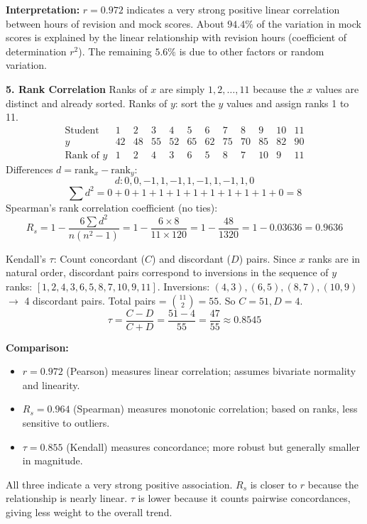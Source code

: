 \documentclass[11pt]{article}
\begin{document}
\begin{exoresolu}
\textbf{Interpretation:} $r = 0.972$ indicates a very strong positive linear correlation between hours of revision and mock scores. About $94.4\%$ of the variation in mock scores is explained by the linear relationship with revision hours (coefficient of determination $r^2$). The remaining $5.6\%$ is due to other factors or random variation.

\textbf{5. Rank Correlation}
Ranks of $x$ are simply $1,2,\dots,11$ because the $x$ values are distinct and already sorted.
Ranks of $y$: sort the $y$ values and assign ranks 1 to 11.
\[
\begin{array}{c|ccccccccccc}
\text{Student} & 1 & 2 & 3 & 4 & 5 & 6 & 7 & 8 & 9 & 10 & 11 \\
\hline
y & 42 & 48 & 55 & 52 & 65 & 62 & 75 & 70 & 85 & 82 & 90 \\
\text{Rank of } y & 1 & 2 & 4 & 3 & 6 & 5 & 8 & 7 & 10 & 9 & 11
\end{array}
\]
Differences $d = \text{rank}_x - \text{rank}_y$:
\[
d: 0, 0, -1, 1, -1, 1, -1, 1, -1, 1, 0
\]
\[
\sum d^2 = 0+0+1+1+1+1+1+1+1+1+0 = 8
\]
Spearman's rank correlation coefficient (no ties):
\[
R_s = 1 - \frac{6\sum d^2}{n(n^2-1)} = 1 - \frac{6 \times 8}{11 \times 120} = 1 - \frac{48}{1320} = 1 - 0.03636 = 0.9636
\]

Kendall's $\tau$: Count concordant ($C$) and discordant ($D$) pairs. Since $x$ ranks are in natural order, discordant pairs correspond to inversions in the sequence of $y$ ranks: $[1,2,4,3,6,5,8,7,10,9,11]$. Inversions: $(4,3), (6,5), (8,7), (10,9)$ $\to$ 4 discordant pairs. Total pairs = $\binom{11}{2} = 55$. So $C = 51, D = 4$.
\[
\tau = \frac{C - D}{C + D} = \frac{51 - 4}{55} = \frac{47}{55} \approx 0.8545
\]

\textbf{Comparison:}
\begin{itemize}
    \item $r = 0.972$ (Pearson) measures linear correlation; assumes bivariate normality and linearity.
    \item $R_s = 0.964$ (Spearman) measures monotonic correlation; based on ranks, less sensitive to outliers.
    \item $\tau = 0.855$ (Kendall) measures concordance; more robust but generally smaller in magnitude.
\end{itemize}
All three indicate a very strong positive association. $R_s$ is closer to $r$ because the relationship is nearly linear. $\tau$ is lower because it counts pairwise concordances, giving less weight to the overall trend.


\end{exoresolu}
\end{document}
